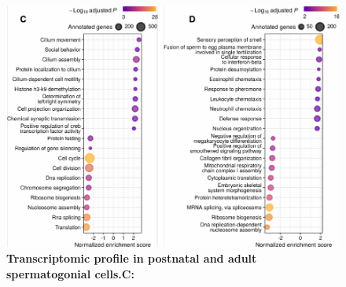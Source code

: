 \documentclass[12pt,twoside]{reedthesis}
\begin{document}
\begin{subfigures}
\begin{figure}[H]

{\centering \includegraphics{thesis_files/figure-latex/df2b-1} 

}

\caption[Transcriptomic profile in postnatal and adult spermatogonial cells]{\textbf{Transcriptomic profile in postnatal and adult spermatogonial cells.}\newline \textbf{C:}}\label{fig:df2b}
\end{figure}
\end{subfigures}
\end{document}
